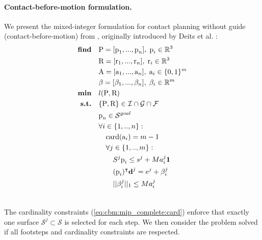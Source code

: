 \paragraph{Contact-before-motion formulation.\label{par:cbm:formulation}}
We present the mixed-integer formulation for contact planning without guide (contact-before-motion) from \cite{sl1m_v2}, originally introduced by Deits et al. \cite{deits2014FootPlanMI}:
\begin{align}
    \textrm{\textbf{find}}  \quad & \mbox{P}=[\mbox{p}_1,...,\mbox{p}_n], \;\mbox{p}_i \in \mathbb{R}^{3} \nonumber\\
                            \quad & \mbox{R}=[\mbox{r}_1,...,\mbox{r}_n], \; \mbox{r}_i \in \mathbb{R}^{3} \nonumber\\
                            \quad & \mbox{A}=[\mbox{a}_1,...,\mbox{a}_n], \; \mbox{a}_i \in \{0,1\}^{m} \nonumber \\
                            \quad & \beta=[\beta_1,...,\beta_n], \; \beta_i \in \mathbb{R}^{m} \nonumber\\
    \textrm{\textbf{min}}  \quad & l(\mbox{P},\mbox{R}) \nonumber\\
    \textrm{\textbf{s.t.}}  \quad & \{\mbox{P},\mbox{R}\} \in \mathcal{I} \cap \mathcal{G} \cap \mathcal{F} \nonumber\\
                            \quad &\mbox{p}_n \in \mathcal{S}^{goal} \nonumber\\
                            \quad & \forall i \in \{1,..,n\} : \nonumber\\
                                \quad & \quad \mbox{card}(\mbox{a}_i) = m-1 \label{eq:cbm:mip_complete:card}\\
                                \quad & \quad \forall j \in \{1,..,m\} : \nonumber\\
                                    \quad & \quad \quad S^j\mbox{p}_i \leq s^j + M a_i^j \textbf{1} \nonumber\\
                                    \quad & \quad \quad (\mbox{p}_i)^{\intercal} \textbf{d}^j = e^j + \beta_i^j \nonumber\\
                                    \quad & \quad \quad ||\beta_i^j||_1 \leq M a_i^j \nonumber\\
                                    \nonumber
\end{align}

The cardinality constraints (\ref{eq:cbm:mip_complete:card}) enforce that exactly one surface $\mathcal{S}^j \subset \mathcal{S}$ is selected for each step.
We then consider the problem solved if all footsteps and cardinality constraints are respected.

